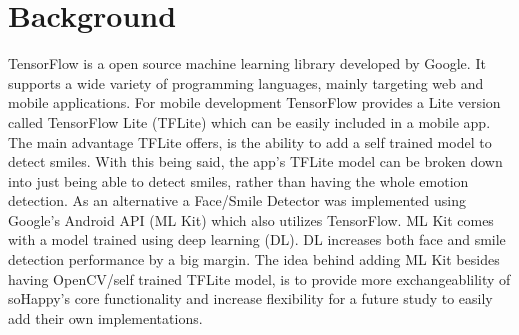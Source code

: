 \section{Background} \label{sec:background}
TensorFlow is a open source machine learning library developed by Google.
It supports a wide variety of programming languages, mainly targeting web and mobile applications.
For mobile development TensorFlow provides a Lite version called TensorFlow Lite (TFLite) which can be easily included in a mobile app.
The main advantage TFLite offers, is the ability to add a self trained model to detect smiles.
With this being said, the app's TFLite model can be broken down into just being able to detect smiles, rather than having the whole emotion detection.
As an alternative a Face/Smile Detector was implemented using Google's Android API (ML Kit) which also utilizes TensorFlow.
ML Kit comes with a model trained using deep learning (DL).
DL increases both face and smile detection performance by a big margin.
The idea behind adding ML Kit besides having OpenCV/self trained TFLite model, is to provide more exchangeablility of soHappy's core functionality and increase flexibility for a future study to easily add their own implementations.

